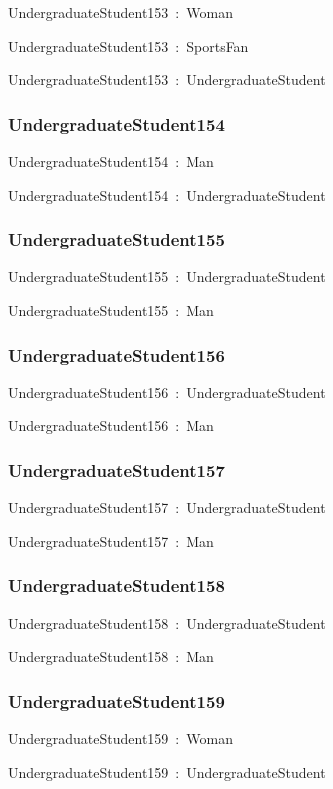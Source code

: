 \documentclass{article}
\begin{document}
UndergraduateStudent153~:~Woman

UndergraduateStudent153~:~SportsFan

UndergraduateStudent153~:~UndergraduateStudent

\subsubsection*{UndergraduateStudent154}

UndergraduateStudent154~:~Man

UndergraduateStudent154~:~UndergraduateStudent

\subsubsection*{UndergraduateStudent155}

UndergraduateStudent155~:~UndergraduateStudent

UndergraduateStudent155~:~Man

\subsubsection*{UndergraduateStudent156}

UndergraduateStudent156~:~UndergraduateStudent

UndergraduateStudent156~:~Man

\subsubsection*{UndergraduateStudent157}

UndergraduateStudent157~:~UndergraduateStudent

UndergraduateStudent157~:~Man

\subsubsection*{UndergraduateStudent158}

UndergraduateStudent158~:~UndergraduateStudent

UndergraduateStudent158~:~Man

\subsubsection*{UndergraduateStudent159}

UndergraduateStudent159~:~Woman

UndergraduateStudent159~:~UndergraduateStudent
\end{document}
